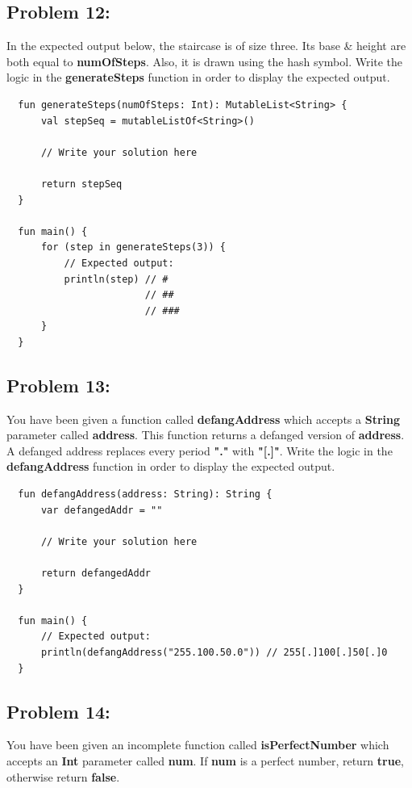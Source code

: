 \documentclass{article}
\begin{document}
\subsection*{Problem 12:}
In the expected output below, the staircase is of size three. Its base \& height are both equal to \textbf{numOfSteps}. Also, it is drawn using the hash symbol. Write the logic in the \textbf{generateSteps} function in order to display the expected output.

\begin{verbatim}
  fun generateSteps(numOfSteps: Int): MutableList<String> {
      val stepSeq = mutableListOf<String>()

      // Write your solution here

      return stepSeq  
  }

  fun main() {
      for (step in generateSteps(3)) {
          // Expected output:
          println(step) // #  
                        // ## 
                        // ###
      }
  }
\end{verbatim}

\subsection*{Problem 13:}
You have been given a function called \textbf{defangAddress} which accepts a \textbf{String} parameter called \textbf{address}. This function returns a defanged version of \textbf{address}. A defanged address replaces every period \textbf{"."} with \textbf{"[.]"}. Write the logic in the \textbf{defangAddress} function in order to display the expected output.

\begin{verbatim}
  fun defangAddress(address: String): String {
      var defangedAddr = ""

      // Write your solution here

      return defangedAddr
  }

  fun main() {
      // Expected output:
      println(defangAddress("255.100.50.0")) // 255[.]100[.]50[.]0
  }
\end{verbatim}

\subsection*{Problem 14:}
You have been given an incomplete function called \textbf{isPerfectNumber} which accepts an \textbf{Int} parameter called \textbf{num}. If \textbf{num} is a perfect number, return \textbf{true}, otherwise return \textbf{false}.
\end{document}
